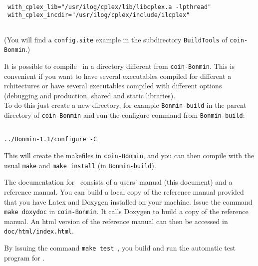 \begin{colorverb}
 \begin{verbatim}

 with_cplex_lib="/usr/ilog/cplex/lib/libcplex.a -lpthread"
 with_cplex_incdir="/usr/ilog/cplex/include/ilcplex"
 
 \end{verbatim}
\end{colorverb}

 (You will find a {\tt config.site} example in the subdirectory {\tt BuildTools} of {\tt coin-Bonmin}.)

It is possible to compile \Bonmin\ in a directory different from {\tt coin-Bonmin}.
This is convenient if you want to have several executables compiled for different a
rchitectures or have several executables compiled with different options
(debugging and production, shared and static libraries).\\

To do this just create a new directory, for example {\tt Bonmin-build} in the parent directory of
{\tt coin-Bonmin} and run the configure command from {\tt Bonmin-build}:


\begin{colorverb}
\begin{verbatim}

../Bonmin-1.1/configure -C

\end{verbatim}
\end{colorverb}

This will create the makefiles in {\tt coin-Bonmin}, and
you can then compile with the usual {\tt make} and {\tt make install}
(in {\tt Bonmin-build}).

The documentation for \Bonmin\ consists of a users' manual (this document) and a reference manual.
You can build a local copy of the reference manual provided that you have Latex
and Doxygen installed on your machine. Issue the command {\tt make
doxydoc} in {\tt coin-Bonmin}. It calls Doxygen to build a copy of the
reference manual. An html version of the reference manual can then
be accessed in {\tt doc/html/index.html}.


By issuing the command {\tt make test}~, you build and run the automatic test program for \Bonmin.
